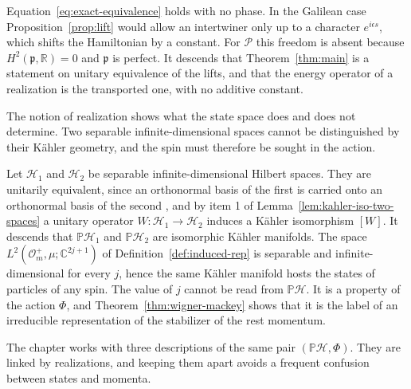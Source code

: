 \begin{remark}
	Equation~\eqref{eq:exact-equivalence} holds with no phase. In the Galilean case Proposition~\ref{prop:lift} would allow an intertwiner only up to a character $e^{i\epsilon s}$, which shifts the Hamiltonian by a constant. For $\mathcal{P}$ this freedom is absent because $H^2(\mathfrak{p},\mathbb{R})=0$ and $\mathfrak{p}$ is perfect. It descends that Theorem~\ref{thm:main} is a statement on unitary equivalence of the lifts, and that the energy operator of a realization is the transported one, with no additive constant.
\end{remark}

The notion of realization shows what the state space does and does not determine. Two separable infinite-dimensional spaces cannot be distinguished by their Kähler geometry, and the spin must therefore be sought in the action.

\begin{remark}\label{rem:ph-no-spin}
	Let $\mathcal{H}_1$ and $\mathcal{H}_2$ be separable infinite-dimensional Hilbert spaces. They are unitarily equivalent, since an orthonormal basis of the first is carried onto an orthonormal basis of the second \cite[TODO-location]{TODO-Mor18}, and by item 1 of Lemma~\ref{lem:kahler-iso-two-spaces} a unitary operator $W:\mathcal{H}_1\to\mathcal{H}_2$ induces a Kähler isomorphism $[W]$. It descends that $\mathbb{P}\mathcal{H}_1$ and $\mathbb{P}\mathcal{H}_2$ are isomorphic Kähler manifolds. The space $L^2(\mathcal{O}_m^+,\mu;\mathbb{C}^{2j+1})$ of Definition~\ref{def:induced-rep} is separable and infinite-dimensional for every $j$, hence the same Kähler manifold hosts the states of particles of any spin. The value of $j$ cannot be read from $\mathbb{P}\mathcal{H}$. It is a property of the action $\Phi$, and Theorem~\ref{thm:wigner-mackey} shows that it is the label of an irreducible representation of the stabilizer of the rest momentum.
\end{remark}

The chapter works with three descriptions of the same pair $(\mathbb{P}\mathcal{H},\Phi)$. They are linked by realizations, and keeping them apart avoids a frequent confusion between states and momenta.

